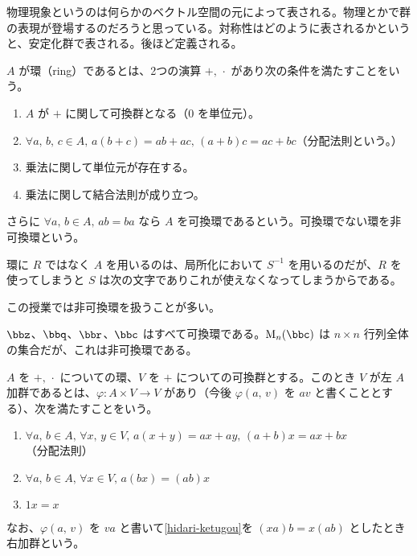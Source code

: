 \documentclass[a4paper]{ltjsarticle}
\begin{document}

物理現象というのは何らかのベクトル空間の元によって表される。物理とかで群の表現が登場するのだろうと思っている。対称性はどのように表されるかというと、安定化群で表される。後ほど定義される。

\begin{dfn}[環]
  $A$ が環（ring）であるとは、2つの演算 $+,\,\cdot$ があり次の条件を満たすことをいう。
  \begin{enumerate}
    \item $A$ が $+$ に関して可換群となる（$0$ を単位元）。
    \item $\forall a,\,b,\,c\in A,\,a(b+c) = ab + ac,\,(a+b)c = ac + bc$（分配法則という。）
    \item 乗法に関して単位元が存在する。
    \item 乗法に関して結合法則が成り立つ。
  \end{enumerate}
  さらに $\forall a,\,b\in A,\,ab = ba$ なら $A$ を可換環であるという。可換環でない環を非可換環という。
\end{dfn}

\begin{rem}
環に $R$ ではなく $A$ を用いるのは、局所化において $S^{-1}$ を用いるのだが、$R$ を使ってしまうと $S$ は次の文字でありこれが使えなくなってしまうからである。
\end{rem}

この授業では非可換環を扱うことが多い。


\begin{exm}
  $\bbz$、$\bbq$、$\bbr$、$\bbc$ はすべて可換環である。$\M_n(\bbc)$ は $n\times n$ 行列全体の集合だが、これは非可換環である。
\end{exm}

\begin{dfn}[環上の加群]
  $A$ を $+,\,\cdot$ についての環、$V$ を $+$ についての可換群とする。このとき $V$ が左 $A$ 加群であるとは、$\varphi\colon A\times V\to V$ があり（今後 $\varphi(a,\,v)$ を $av$ と書くこととする）、次を満たすことをいう。
  \begin{enumerate}
    \item $\forall a,\,b\in A,\,\forall x,\,y\in V,\,a(x+y) = ax + ay,\,(a+b)x = ax + bx$（分配法則）
    \item $\forall a,\,b\in A,\,\forall x\in V,\,a(bx) = (ab)x$\label{hidari-ketugou}
    \item $1x = x$
  \end{enumerate}
  なお、$\varphi(a,\,v)$ を $va$ と書いて\cref{hidari-ketugou}を $(xa)b = x(ab)$ としたとき右加群という。
\end{dfn}
\end{document}
